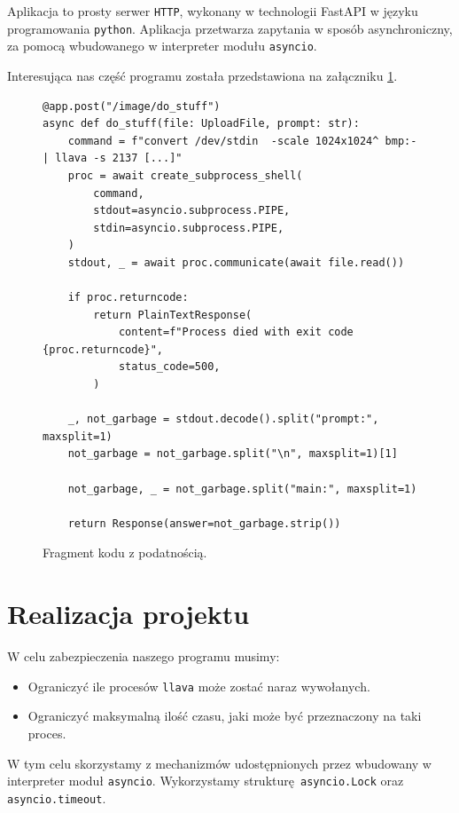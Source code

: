 \documentclass[12pt,a4paper]{article}
\begin{document}
Aplikacja to prosty serwer \texttt{HTTP}, wykonany w technologii FastAPI w
języku programowania \texttt{python}.
Aplikacja przetwarza zapytania w sposób asynchroniczny, za pomocą wbudowanego w
interpreter modułu \texttt{asyncio}.

Interesująca nas część programu została przedstawiona na załączniku
\ref{podatny}.

\begin{figure}[p]
\begin{verbatim}
@app.post("/image/do_stuff")
async def do_stuff(file: UploadFile, prompt: str):
    command = f"convert /dev/stdin  -scale 1024x1024^ bmp:- | llava -s 2137 [...]"
    proc = await create_subprocess_shell(
        command,
        stdout=asyncio.subprocess.PIPE,
        stdin=asyncio.subprocess.PIPE,
    )
    stdout, _ = await proc.communicate(await file.read())

    if proc.returncode:
        return PlainTextResponse(
            content=f"Process died with exit code {proc.returncode}",
            status_code=500,
        )

    _, not_garbage = stdout.decode().split("prompt:", maxsplit=1)
    not_garbage = not_garbage.split("\n", maxsplit=1)[1]

    not_garbage, _ = not_garbage.split("main:", maxsplit=1)

    return Response(answer=not_garbage.strip())
\end{verbatim}
  \caption{Fragment kodu z podatnością.}\label{podatny}
\end{figure}

\newpage

\section{Realizacja projektu}

W celu zabezpieczenia naszego programu musimy:

\begin{itemize}
  \item Ograniczyć ile procesów \texttt{llava} może zostać naraz wywołanych.
  \item Ograniczyć maksymalną ilość czasu, jaki może być przeznaczony na taki
    proces.
\end{itemize}

W tym celu skorzystamy z mechanizmów udostępnionych przez wbudowany w
interpreter moduł \texttt{asyncio}. Wykorzystamy strukturę \texttt{asyncio.Lock}
oraz \texttt{asyncio.timeout}. 
\end{document}
